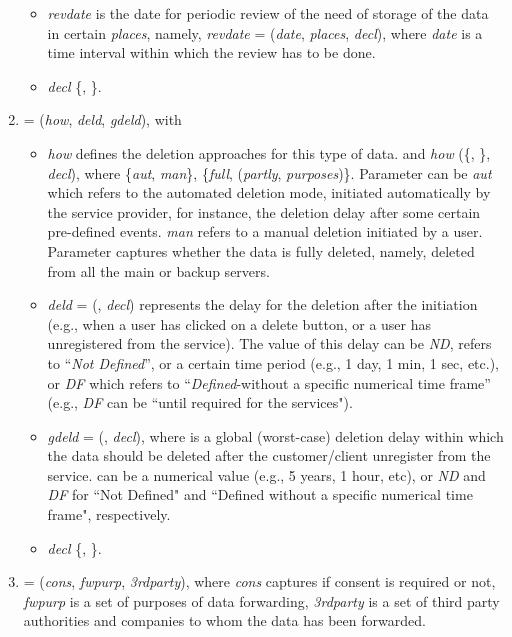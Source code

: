 \documentclass[a4paper]{article}
\begin{document}
\begin{enumerate}
\begin{itemize}
\item \textit{revdate} is the date for periodic review of the need of storage of the data  in certain \textit{places}, namely, \textit{revdate} = (\textit{date}, \textit{places}, \textit{decl}), where \textit{date} is a time interval within which the review has to be done.  

\item  \textit{decl}  \{, \}.
\end{itemize}

\item  = (\textit{how}, \textit{deld},   \textit{gdeld}), with 
\begin{itemize}
\item \textit{how} defines the deletion approaches for this type of data. and \textit{how}  (\{, \}, \textit{decl}), where   \{\textit{aut}, \textit{man}\},    \{\textit{full}, (\textit{partly}, \textit{purposes})\}. Parameter  can be \textit{aut} which refers to the automated deletion mode, initiated automatically by the service provider, for instance, the deletion delay after some certain pre-defined events. \textit{man} refers to a manual deletion initiated by a user.  Parameter  captures whether the data is fully deleted, namely, deleted from all the main or backup servers.   

\item \textit{deld} = (, \textit{decl}) represents the delay for the deletion after the initiation (e.g., when a user 
has clicked on a delete button, or a user has unregistered from the service). The value of this delay can be \textit{ND}, refers to ``\textit{Not Defined}'', or a certain time period (e.g., 1 day, 1 min, 1 sec, etc.), or \textit{DF} which refers to ``\textit{Defined}-without a specific numerical time frame'' (e.g., \textit{DF} can be ``until required for the services").        

\item \textit{gdeld} = (, \textit{decl}), where  is a global (worst-case) deletion delay within which the data should be deleted after the customer/client unregister from the service.  can be a numerical value (e.g., 5 years, 1 hour, etc), or \textit{ND} and \textit{DF} for ``Not Defined" and ``Defined without a specific numerical time frame", respectively.       

\item  \textit{decl}  \{, \}. 
\end{itemize}

\item  = (\textit{cons}, \textit{fwpurp}, \textit{3rdparty}), where \textit{cons} captures if consent is required or not, \textit{fwpurp} is a set of purposes of data forwarding,  \textit{3rdparty} is a set of third party authorities and companies to whom the data has been forwarded.   

\end{enumerate}
\end{document}
